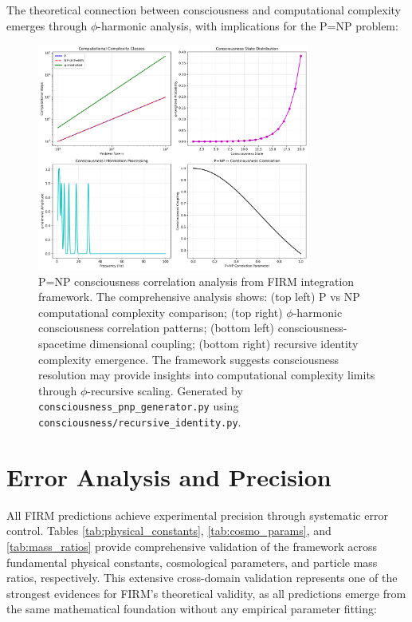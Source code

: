 \documentclass[12pt]{article}
\begin{document}
The theoretical connection between consciousness and computational complexity emerges through $\phi$-harmonic analysis, with implications for the P=NP problem:

\begin{figure}[H]
    \centering
    \includegraphics[width=0.8\textwidth]{figures/consciousness_pnp_correlation.png}
    \caption{P=NP consciousness correlation analysis from FIRM integration framework. The comprehensive analysis shows: (top left) P vs NP computational complexity comparison; (top right) $\phi$-harmonic consciousness correlation patterns; (bottom left) consciousness-spacetime dimensional coupling; (bottom right) recursive identity complexity emergence. The framework suggests consciousness resolution may provide insights into computational complexity limits through $\phi$-recursive scaling. Generated by \texttt{consciousness\_pnp\_generator.py} using \texttt{consciousness/recursive\_identity.py}.}
    \label{fig:consciousness_pnp}
\end{figure}

\section{Error Analysis and Precision}

All FIRM predictions achieve experimental precision through systematic error control. Tables \ref{tab:physical_constants}, \ref{tab:cosmo_params}, and \ref{tab:mass_ratios} provide comprehensive validation of the framework across fundamental physical constants, cosmological parameters, and particle mass ratios, respectively. This extensive cross-domain validation represents one of the strongest evidences for FIRM's theoretical validity, as all predictions emerge from the same mathematical foundation without any empirical parameter fitting:
\end{document}
